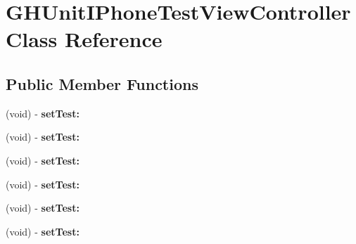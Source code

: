 \hypertarget{interface_g_h_unit_i_phone_test_view_controller}{
\section{\-G\-H\-Unit\-I\-Phone\-Test\-View\-Controller \-Class \-Reference}
\label{interface_g_h_unit_i_phone_test_view_controller}
}
\subsection*{\-Public \-Member \-Functions}
\begin{DoxyCompactItemize}
\item 
\hypertarget{interface_g_h_unit_i_phone_test_view_controller_a9cf664e20ffeadeed3da43d1ada4d81f}{
(void) -\/ {\bfseries set\-Test\-:}}
\label{interface_g_h_unit_i_phone_test_view_controller_a9cf664e20ffeadeed3da43d1ada4d81f}

\item 
\hypertarget{interface_g_h_unit_i_phone_test_view_controller_a9cf664e20ffeadeed3da43d1ada4d81f}{
(void) -\/ {\bfseries set\-Test\-:}}
\label{interface_g_h_unit_i_phone_test_view_controller_a9cf664e20ffeadeed3da43d1ada4d81f}

\item 
\hypertarget{interface_g_h_unit_i_phone_test_view_controller_a9cf664e20ffeadeed3da43d1ada4d81f}{
(void) -\/ {\bfseries set\-Test\-:}}
\label{interface_g_h_unit_i_phone_test_view_controller_a9cf664e20ffeadeed3da43d1ada4d81f}

\item 
\hypertarget{interface_g_h_unit_i_phone_test_view_controller_a9cf664e20ffeadeed3da43d1ada4d81f}{
(void) -\/ {\bfseries set\-Test\-:}}
\label{interface_g_h_unit_i_phone_test_view_controller_a9cf664e20ffeadeed3da43d1ada4d81f}

\item 
\hypertarget{interface_g_h_unit_i_phone_test_view_controller_a9cf664e20ffeadeed3da43d1ada4d81f}{
(void) -\/ {\bfseries set\-Test\-:}}
\label{interface_g_h_unit_i_phone_test_view_controller_a9cf664e20ffeadeed3da43d1ada4d81f}

\item 
\hypertarget{interface_g_h_unit_i_phone_test_view_controller_a9cf664e20ffeadeed3da43d1ada4d81f}{
(void) -\/ {\bfseries set\-Test\-:}}
\label{interface_g_h_unit_i_phone_test_view_controller_a9cf664e20ffeadeed3da43d1ada4d81f}


\end{DoxyCompactItemize}
